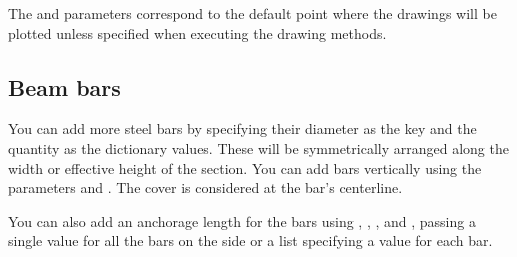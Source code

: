\documentclass[a4paper,10pt,english]{sphinxmanual}
\begin{document}
\sphinxAtStartPar
The  and  parameters correspond to the default point where the drawings will be plotted unless specified when
executing the drawing methods.


\subsection{Beam bars}
\label{\detokenize{usage:beam-bars}}\label{\detokenize{usage:beam-bars-label}}
\sphinxAtStartPar
You can add more steel bars by specifying their diameter as the key and the quantity as the dictionary values. These
will be symmetrically arranged along the width or effective height of the section. You can add bars vertically using
the parameters  and . The cover is considered at the bar’s centerline.

\begin{sphinxVerbatim}[commandchars=\\\{\}]
  
                   
                 
                   
                 
                  
\end{sphinxVerbatim}

\sphinxAtStartPar
You can also add an anchorage length for the bars using , , , and ,
passing a single value for all the bars on the side or a list specifying a value for each bar.
\end{document}
